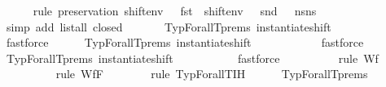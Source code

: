 \begin{isabellebody}
\ \ \ \ \isamarkupfalse%
\ {\isacharparenleft}{\kern0pt}rule\ preservation{\isacharparenleft}{\kern0pt}{}{\isacharparenright}{\kern0pt}{\isacharbrackleft}{\kern0pt}\ {\isacharquery}{\kern0pt}{\isasymDelta}{\isacharequal}{\kern0pt}{\isachardoublequoteopen}{\isacharparenleft}{\kern0pt}shift{\isacharunderscore}{\kern0pt}env\ {}\ {}\ {\isacharparenleft}{\kern0pt}fst\ {\isasymDelta}{\isacharparenright}{\kern0pt}{\isacharcomma}{\kern0pt}\ shift{\isacharunderscore}{\kern0pt}env\ {}\ {}\ {\isacharparenleft}{\kern0pt}snd\ {\isasymDelta}{\isacharparenright}{\kern0pt}{\isacharparenright}{\kern0pt}{\isachardoublequoteclose}\ \ {\isacharquery}{\kern0pt}n{\isacharunderscore}{\kern0pt}s{\isacharequal}{\kern0pt}{\isachardoublequoteopen}n{\isacharunderscore}{\kern0pt}s{\isachardoublequoteclose}{\isacharbrackright}{\kern0pt}{\isacharparenright}{\kern0pt}\isanewline
\ \ \ \ \ \ \ \ \ \ \isamarkupfalse%
\ {\isacharparenleft}{\kern0pt}simp\ add{\isacharcolon}{\kern0pt}\ {\isacartoucheopen}list{\isacharunderscore}{\kern0pt}all\ closed\ {\isasymOmega}{\isacartoucheclose}{\isacharparenright}{\kern0pt}\isanewline
\ \ \ \ \isamarkupfalse%
\ TypForallT{\isachardot}{\kern0pt}prems\ instantiate{\isacharunderscore}{\kern0pt}shift\isanewline
\ \ \ \ \ \ \ \ \ \ \isamarkupfalse%
\ fastforce\isanewline
\ \ \ \ \isamarkupfalse%
\ TypForallT{\isachardot}{\kern0pt}prems\ instantiate{\isacharunderscore}{\kern0pt}shift\isanewline
\ \ \ \ \ \ \ \ \ \ \isamarkupfalse%
\ fastforce\isanewline
\ \ \ \ \isamarkupfalse%
\ TypForallT{\isachardot}{\kern0pt}prems\ instantiate{\isacharunderscore}{\kern0pt}shift\isanewline
\ \ \ \ \ \ \ \ \ \isamarkupfalse%
\ fastforce\isanewline
\ \ \ \ \ \ \ \ \isamarkupfalse%
\ {\isacharparenleft}{\kern0pt}rule\ Wf{\isacharunderscore}{\kern0pt}{\isasymGamma}{\isacharparenright}{\kern0pt}\isanewline
\ \ \ \ \ \ \ \ \isamarkupfalse%
\ {\isacharparenleft}{\kern0pt}rule\ Wf{\isacharunderscore}{\kern0pt}F{\isacharparenright}{\kern0pt}\isanewline
\ \ \ \ \ \ \isamarkupfalse%
\ {\isacharparenleft}{\kern0pt}rule\ TypForallT{\isachardot}{\kern0pt}IH{\isacharparenleft}{\kern0pt}{}{\isacharparenright}{\kern0pt}{\isacharparenright}{\kern0pt}\isanewline
\ \ \ \ \isamarkupfalse%
\ TypForallT{\isachardot}{\kern0pt}prems\ \isamarkupfalse%

\end{isabellebody}
